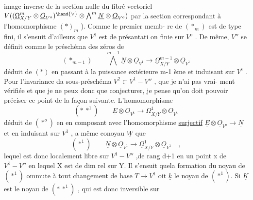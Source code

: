 
image inverse de la section nulle du fibré vectoriel $V((\underline{\Omega}^m_{X/Y}\otimes\underline{O}_{V^o})^{\hand{\vee}}\otimes\bigwedge^m\underline{N}\otimes\underline{O}_{V^o})$
par la section correspondant à l'homomorphisme $(*)_{m}$ ). Comme le premier memb-%
re de $(*_m)$ est de type fini, il s'ensuit d'ailleurs que $V^1$ est de présantati%
on finie sur $V^o$ . De même, $V''$ se définit comme le préschéma des zéros de
\[ (*_{m-1}) \qquad \bigwedge^{m-1}\underline{N}\otimes\underline{O}_{V^1} \longrightarrow \underline{\Omega}^{m-1}_{X/Y}\otimes\underline{O}_{V^1} \]
déduit de $(*)$ en passant à la puissance extérieure m-1 ème et induisant sur
$V^1$ . Pour l'invariance da sous-préschéma $V^2\subset V^1-V''$ , que je n'ai pas vrai-%
ment vérifiée et que je ne peux donc que conjecturer, je pense qu'on doit
pouvoir préciser ce point de la façon suivante. L'homomorphisme
\[ (*\,*^1) \qquad \underline{E}\otimes\underline{O}_{V^1}\longrightarrow\underline{\Omega}^1_{X/Y}\otimes\underline{O}_{V^1} \]
déduit de $(*^o)$ en  en composant avec l'homomorphisme
\uline{surjectif} $\underline{E}\otimes\underline{O}_{V^o}\to\underline{N}$ et en  induisant sur $V^1$ , a même conoyau
$\underline{W}$ que
\[ (*^1) \qquad \underline{N}\otimes\underline{O}_{V^1}\to\underline{\Omega}^1_{X/Y}\otimes\underline{O}_{V^1} \quad , \]
lequel  est donc localement libre sur $V^1-V''$ ,\hand{(}de rang d+1 en un point
x de $V^1-V''$ en lequel X est de dim rel  sur Y\hand{)}. Il s'ensuit quela formation
du noyau de $(*^1)$ ommute à tout changement de base $T\to V^1$ oit $\underline{k}$ le
noyau de $(*^1)$. Si $\underline{K}$ est le noyau de $(*\,*^1)$ , qui est donc inversible sur
